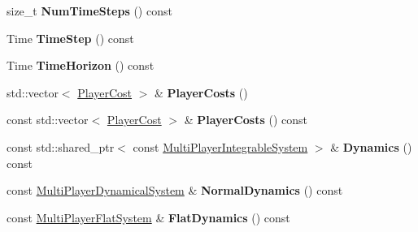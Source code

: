 \begin{DoxyCompactItemize}
\item 
size\+\_\+t {\bfseries Num\+Time\+Steps} () const \hypertarget{classilqgames_1_1_problem_afdd2a8fe429014bc5aa5fe9de4cbd0c1}{}\label{classilqgames_1_1_problem_afdd2a8fe429014bc5aa5fe9de4cbd0c1}

\item 
Time {\bfseries Time\+Step} () const \hypertarget{classilqgames_1_1_problem_af0a09c4e19ddf5fca85136d4187eb3d8}{}\label{classilqgames_1_1_problem_af0a09c4e19ddf5fca85136d4187eb3d8}

\item 
Time {\bfseries Time\+Horizon} () const \hypertarget{classilqgames_1_1_problem_acdabeeb3611f8887b0d104ea41d0ab12}{}\label{classilqgames_1_1_problem_acdabeeb3611f8887b0d104ea41d0ab12}

\item 
std\+::vector$<$ \hyperlink{classilqgames_1_1_player_cost}{Player\+Cost} $>$ \& {\bfseries Player\+Costs} ()\hypertarget{classilqgames_1_1_problem_ae59a04bdc7c289ef9272dee1e51df892}{}\label{classilqgames_1_1_problem_ae59a04bdc7c289ef9272dee1e51df892}

\item 
const std\+::vector$<$ \hyperlink{classilqgames_1_1_player_cost}{Player\+Cost} $>$ \& {\bfseries Player\+Costs} () const \hypertarget{classilqgames_1_1_problem_aeabbed16991559662d78969f38b2b3cc}{}\label{classilqgames_1_1_problem_aeabbed16991559662d78969f38b2b3cc}

\item 
const std\+::shared\+\_\+ptr$<$ const \hyperlink{classilqgames_1_1_multi_player_integrable_system}{Multi\+Player\+Integrable\+System} $>$ \& {\bfseries Dynamics} () const \hypertarget{classilqgames_1_1_problem_a962651aa1abfb09183d510fec93850d7}{}\label{classilqgames_1_1_problem_a962651aa1abfb09183d510fec93850d7}

\item 
const \hyperlink{classilqgames_1_1_multi_player_dynamical_system}{Multi\+Player\+Dynamical\+System} \& {\bfseries Normal\+Dynamics} () const \hypertarget{classilqgames_1_1_problem_a2c5d9b8b9e0fc7c5b6701b36c56c3de6}{}\label{classilqgames_1_1_problem_a2c5d9b8b9e0fc7c5b6701b36c56c3de6}

\item 
const \hyperlink{classilqgames_1_1_multi_player_flat_system}{Multi\+Player\+Flat\+System} \& {\bfseries Flat\+Dynamics} () const \hypertarget{classilqgames_1_1_problem_ad8156514824a3851eab54c3b85b062fe}{}\label{classilqgames_1_1_problem_ad8156514824a3851eab54c3b85b062fe}


\end{DoxyCompactItemize}
